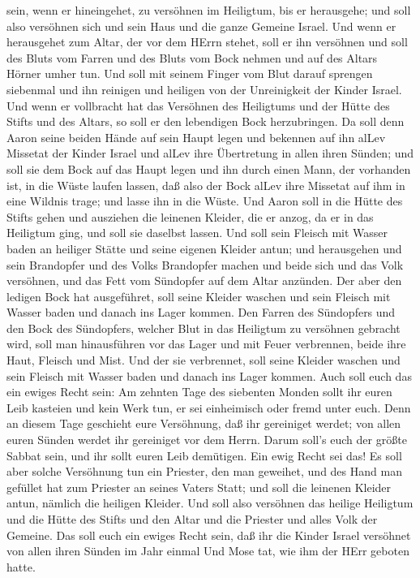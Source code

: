 sein, wenn er hineingehet, zu versöhnen im Heiligtum, bis er herausgehe;
und soll also versöhnen sich und sein Haus und die ganze Gemeine Israel.
 Und wenn er herausgehet zum Altar, der vor dem HErrn
stehet, soll er ihn versöhnen und soll des Bluts vom Farren und des
Bluts vom Bock nehmen und auf des Altars Hörner umher tun. 
Und soll mit seinem Finger vom Blut darauf sprengen siebenmal und ihn
reinigen und heiligen von der Unreinigkeit der Kinder Israel.
 Und wenn er vollbracht hat das Versöhnen des Heiligtums
und der Hütte des Stifts und des Altars, so soll er den lebendigen Bock
herzubringen.  Da soll denn Aaron seine beiden Hände auf
sein Haupt legen und bekennen auf ihn alLev Missetat der Kinder Israel
und alLev ihre Übertretung in allen ihren Sünden; und soll sie dem Bock
auf das Haupt legen und ihn durch einen Mann, der vorhanden ist, in die
Wüste laufen lassen,  daß also der Bock alLev ihre Missetat
auf ihm in eine Wildnis trage; und lasse ihn in die Wüste. 
Und Aaron soll in die Hütte des Stifts gehen und ausziehen die leinenen
Kleider, die er anzog, da er in das Heiligtum ging, und soll sie
daselbst lassen.  Und soll sein Fleisch mit Wasser baden an
heiliger Stätte und seine eigenen Kleider antun; und herausgehen und
sein Brandopfer und des Volks Brandopfer machen und beide sich und das
Volk versöhnen,  und das Fett vom Sündopfer auf dem Altar
anzünden.  Der aber den ledigen Bock hat ausgeführet, soll
seine Kleider waschen und sein Fleisch mit Wasser baden und danach ins
Lager kommen.  Den Farren des Sündopfers und den Bock des
Sündopfers, welcher Blut in das Heiligtum zu versöhnen gebracht wird,
soll man hinausführen vor das Lager und mit Feuer verbrennen, beide ihre
Haut, Fleisch und Mist.  Und der sie verbrennet, soll seine
Kleider waschen und sein Fleisch mit Wasser baden und danach ins Lager
kommen.  Auch soll euch das ein ewiges Recht sein: Am
zehnten Tage des siebenten Monden sollt ihr euren Leib kasteien und kein
Werk tun, er sei einheimisch oder fremd unter euch.  Denn
an diesem Tage geschieht eure Versöhnung, daß ihr gereiniget werdet; von
allen euren Sünden werdet ihr gereiniget vor dem Herrn. 
Darum soll's euch der größte Sabbat sein, und ihr sollt euren Leib
demütigen. Ein ewig Recht sei das!  Es soll aber solche
Versöhnung tun ein Priester, den man geweihet, und des Hand man gefüllet
hat zum Priester an seines Vaters Statt; und soll die leinenen Kleider
antun, nämlich die heiligen Kleider.  Und soll also
versöhnen das heilige Heiligtum und die Hütte des Stifts und den Altar
und die Priester und alles Volk der Gemeine.  Das soll euch
ein ewiges Recht sein, daß ihr die Kinder Israel versöhnet von allen
ihren Sünden im Jahr einmal Und Mose tat, wie ihm der HErr geboten
hatte.

